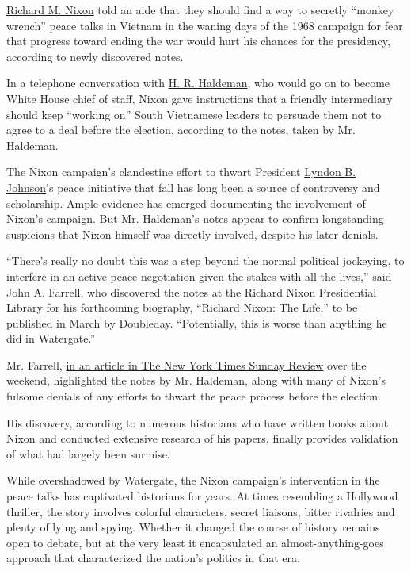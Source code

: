 \href{http://www.nytimes.com/topic/person/richard-milhous-nixon}{Richard
M. Nixon} told an aide that they should find a way to secretly ``monkey
wrench'' peace talks in Vietnam in the waning days of the 1968 campaign
for fear that progress toward ending the war would hurt his chances for
the presidency, according to newly discovered notes.

In a telephone conversation with
\href{http://www.nytimes.com/1993/11/13/obituaries/h-r-haldeman-nixon-aide-who-had-central-role-in-watergate-is-dead-at-67.html}{H.
R. Haldeman}, who would go on to become White House chief of staff,
Nixon gave instructions that a friendly intermediary should keep
``working on'' South Vietnamese leaders to persuade them not to agree to
a deal before the election, according to the notes, taken by Mr.
Haldeman.

The Nixon campaign's clandestine effort to thwart President
\href{http://www.nytimes.com/topic/person/lyndon-b-johnson}{Lyndon B.
Johnson}'s peace initiative that fall has long been a source of
controversy and scholarship. Ample evidence has emerged documenting the
involvement of Nixon's campaign. But
\href{http://www.nytimes.com/interactive/2016/12/31/opinion/sunday/haldeman-notes.html}{Mr.
Haldeman's notes} appear to confirm longstanding suspicions that Nixon
himself was directly involved, despite his later denials.

``There's really no doubt this was a step beyond the normal political
jockeying, to interfere in an active peace negotiation given the stakes
with all the lives,'' said John A. Farrell, who discovered the notes at
the Richard Nixon Presidential Library for his forthcoming biography,
``Richard Nixon: The Life,'' to be published in March by Doubleday.
``Potentially, this is worse than anything he did in Watergate.''

Mr. Farrell,
\href{https://www.nytimes.com/2016/12/31/opinion/sunday/nixons-vietnam-treachery.html?_r=0}{in
an article in The New York Times Sunday Review} over the weekend,
highlighted the notes by Mr. Haldeman, along with many of Nixon's
fulsome denials of any efforts to thwart the peace process before the
election.

His discovery, according to numerous historians who have written books
about Nixon and conducted extensive research of his papers, finally
provides validation of what had largely been surmise.

While overshadowed by Watergate, the Nixon campaign's intervention in
the peace talks has captivated historians for years. At times resembling
a Hollywood thriller, the story involves colorful characters, secret
liaisons, bitter rivalries and plenty of lying and spying. Whether it
changed the course of history remains open to debate, but at the very
least it encapsulated an almost-anything-goes approach that
characterized the nation's politics in that era.

